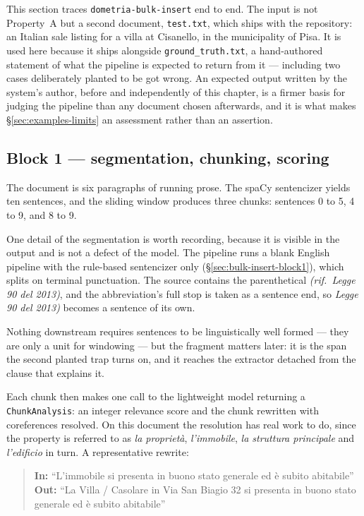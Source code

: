 This section traces \texttt{dometria-bulk-insert} end to end. The input is not Property~A but a second document, \texttt{test.txt}, which ships with the repository: an Italian sale listing for a villa at Cisanello, in the municipality of Pisa. It is used here because it ships alongside \texttt{ground\_truth.txt}, a hand-authored statement of what the pipeline is expected to return from it --- including two cases deliberately planted to be got wrong. An expected output written by the system's author, before and independently of this chapter, is a firmer basis for judging the pipeline than any document chosen afterwards, and it is what makes \S\ref{sec:examples-limits} an assessment rather than an assertion.

\subsection{Block 1 --- segmentation, chunking, scoring}
\label{sec:examples-block1}

The document is six paragraphs of running prose. The spaCy sentencizer yields ten sentences, and the sliding window produces three chunks: sentences 0 to 5, 4 to 9, and 8 to 9.

One detail of the segmentation is worth recording, because it is visible in the output and is not a defect of the model. The pipeline runs a blank English pipeline with the rule-based sentencizer only (\S\ref{sec:bulk-insert-block1}), which splits on terminal punctuation. The source contains the parenthetical \emph{(rif.\ Legge 90 del 2013)}, and the abbreviation's full stop is taken as a sentence end, so \emph{Legge 90 del 2013)} becomes a sentence of its own.

Nothing downstream requires sentences to be linguistically well formed --- they are only a unit for windowing --- but the fragment matters later: it is the span the second planted trap turns on, and it reaches the extractor detached from the clause that explains it.

Each chunk then makes one call to the lightweight model returning a \texttt{ChunkAnalysis}: an integer relevance score and the chunk rewritten with coreferences resolved. On this document the resolution has real work to do, since the property is referred to as \emph{la proprietà}, \emph{l'immobile}, \emph{la struttura principale} and \emph{l'edificio} in turn. A representative rewrite:

\begin{quote}\small
\textbf{In:} ``L'immobile si presenta in buono stato generale ed è subito abitabile''\\
\textbf{Out:} ``La Villa / Casolare in Via San Biagio 32 si presenta in buono stato generale ed è subito abitabile''
\end{quote}


